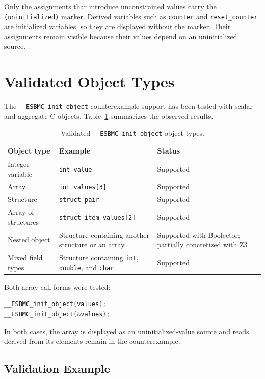 \documentclass[11pt]{article}
\begin{document}
Only the assignments that introduce unconstrained values carry the
\texttt{(uninitialized)} marker.  Derived variables such as \texttt{counter}
and \texttt{reset\_counter} are initialized variables, so they are displayed
without the marker.  Their assignments remain visible because their values
depend on an uninitialized source.

\section{Validated Object Types}

The \texttt{\_\_ESBMC\_init\_object} counterexample support has been tested
with scalar and aggregate C objects.  Table~\ref{tab:init-object-support}
summarizes the observed results.

\begin{table}[ht]
\centering
\begin{tabularx}{\textwidth}{|l|X|l|}
\hline
Object type & Example & Status \\
\hline
Integer variable & \texttt{int value} & Supported \\
\hline
Array & \texttt{int values[3]} & Supported \\
\hline
Structure & \texttt{struct pair} & Supported \\
\hline
Array of structures & \texttt{struct item values[2]} & Supported \\
\hline
Nested object & Structure containing another structure or an array &
Supported with Boolector; partially concretized with Z3 \\
\hline
Mixed field types & Structure containing \texttt{int}, \texttt{double}, and
\texttt{char} & Supported \\
\hline
\end{tabularx}
\caption{Validated \texttt{\_\_ESBMC\_init\_object} object types.}
\label{tab:init-object-support}
\end{table}

Both array call forms were tested:

\begin{lstlisting}[language=C]
__ESBMC_init_object(values);
__ESBMC_init_object(&values);
\end{lstlisting}

In both cases, the array is displayed as an uninitialized-value source and
reads derived from its elements remain in the counterexample.

\subsection{Validation Example}
\end{document}
